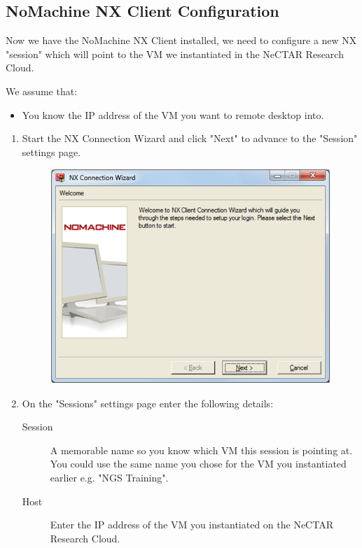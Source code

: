 \subsection{NoMachine NX Client Configuration}
Now we have the NoMachine NX Client installed, we need to configure a new NX
"session" which will point to the VM we instantiated in the NeCTAR Research
Cloud.

We assume that:
\begin{itemize}
\item You know the IP address of the VM you want to remote desktop into.
\end{itemize}

\begin{enumerate}
  \item Start the NX Connection Wizard and click "Next" to advance to the
  "Session" settings page.
  \begin{figure}[H]
    \centering
    \includegraphics[scale=0.5]{post-workshop/nx_client/start_wizard.png}
    \caption{\label{fig:nx_start_wizard}}
  \end{figure}
  \item On the "Sessions" settings page enter the following details:
  \begin{description}
  \item[Session] A memorable name so you know which VM this session is pointing
  at. You could use the same name you chose for the VM you instantiated earlier
  e.g. "NGS Training".
  \item[Host] Enter the IP address of the VM you instantiated on the NeCTAR
  Research Cloud.

\end{description}
\end{enumerate}
